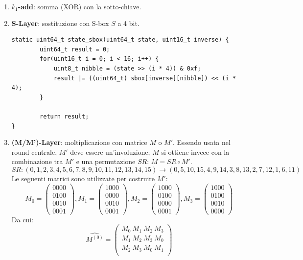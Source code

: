 \documentclass[target=bach,aauheader=,style=]{thud}
\begin{document}
			\begin{enumerate}
				\item \textbf{$k_1$-add}: somma (XOR) con la sotto-chiave.
				\item \textbf{S-Layer}: sostituzione con S-box $S$ a 4 bit.
\begin{lstlisting}[style=CStyle]
	static uint64_t state_sbox(uint64_t state, uint16_t inverse) {
		uint64_t result = 0;
		for(uint16_t i = 0; i < 16; i++) {	
			uint8_t nibble = (state >> (i * 4)) & 0xf;
			result |= ((uint64_t) sbox[inverse][nibble]) << (i * 4);
		}
		
		return result;
}\end{lstlisting}
				\item \textbf{(M/M')-Layer}: moltiplicazione con matrice $M$ o $M'$. Essendo usata nel round centrale, $M'$ deve essere un'involuzione; $M$ si ottiene invece con la combinazione tra $M'$ e una permutazione $SR$: $M = SR \circ M' $.
				\[SR:(0,1,2,3,4,5,6,7,8,9,10,11,12,13,14,15) \rightarrow (0,5,10,15,4,9,14,3,8,13,2,7,12,1,6,11) \]
				Le seguenti matrici sono utilizzate per costruire $M'$:
				\[M_0 = 
				\begin{pmatrix}
					0000\\
					0100\\
					0010\\
					0001
				\end{pmatrix},
				M_1 =
				\begin{pmatrix}
					1000\\
					0000\\
					0010\\
					0001
				\end{pmatrix},
				M_2 =
				\begin{pmatrix}
					1000\\
					0100\\
					0000\\
					0001
				\end{pmatrix},
				M_3 =
				\begin{pmatrix}
					1000\\
					0100\\
					0010\\
					0000
				\end{pmatrix}
				\]
				Da cui:
				\[ \hat{M^{(0)}} = 
				\begin{pmatrix}
					M_0\ M_1\ M_2\ M_3\\
					M_1\ M_2\ M_3\ M_0\\
					M_2\ M_3\ M_0\ M_1\\

\end{pmatrix}\]
\end{enumerate}
\end{document}

